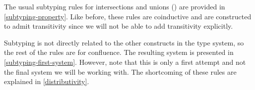 The usual subtyping rules for intersections and unions (\cite{DunfieldP03}) are provided in \cref{subtyping-property}. Like before, these rules are coinductive and are constructed to admit transitivity since we will not be able to add transitivity explicitly.



Subtyping is not directly related to the other constructs in the type system, so the rest of the rules are for confluence. The resulting system is presented in \cref{subtyping-first-system}. However, note that this is only a first attempt and not the final system we will be working with. The shortcoming of these rules are explained in \cref{distributivity}.


